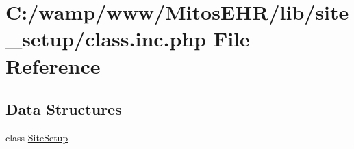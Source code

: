 \hypertarget{class_8inc_8php}{\section{\-C\-:/wamp/www/\-Mitos\-E\-H\-R/lib/site\-\_\-setup/class.inc.\-php \-File \-Reference}
\label{class_8inc_8php}
}
\subsection*{\-Data \-Structures}
\begin{DoxyCompactItemize}
\item 
class \hyperlink{class_site_setup}{\-Site\-Setup}
\end{DoxyCompactItemize}
